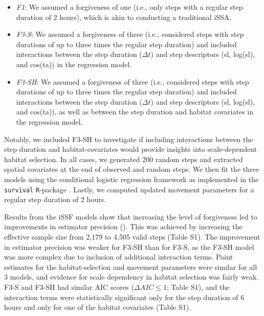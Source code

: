 \documentclass[abstract=on,10pt,a4paper,bibliography=totocnumbered]{article}
\begin{document}
\begin{itemize}
  \item \textit{F1}: We assumed a forgiveness of one (i.e., only steps with a
  regular step duration of 2 hours), which is akin to conducting a traditional
  iSSA.

  \item \textit{F3-S}: We assumed a forgiveness of three (i.e., considered steps
  with step durations of up to three times the regular step duration) and
  included interactions between the step duration ($\Delta t$) and step
  descriptors (sl, log(sl), and cos(ta)) in the regression model.

  \item \textit{F3-SH}: We assumed a forgiveness of three (i.e., considered
  steps with step durations of up to three times the regular step duration) and
  included interactions between the step duration ($\Delta t$) and step
  descriptors (sl, log(sl), and cos(ta)), as well as between the step duration
  and habitat covariates in the regression model.

\end{itemize}

\noindent Notably, we included F3-SH to investigate if including interactions
between the step duration and habitat-covariates would provide insights into
scale-dependent habitat selection. In all cases, we generated 200 random steps
and extracted spatial covariates at the end of observed and random steps. We
then fit the three models using the conditional logistic regression framework as
implemented in the \texttt{survival} \texttt{R}-package \citep{Therneau.2023}.
Lastly, we computed updated movement parameters for a regular step duration of 2
hours.

Results from the iSSF models show that increasing the level of forgiveness led
to improvements in estimator precision (). This was achieved by
increasing the effective sample size from 2,179 to 4,505 valid steps (Table S1).
The improvement in estimator precision was weaker for F3-SH than for F3-S, as
the F3-SH model was more complex due to inclusion of additional interaction
terms. Point estimates for the habitat-selection and movement parameters were
similar for all 3 models, and evidence for scale dependency in habitat selection
was fairly weak. F3-S and F3-SH had similar AIC scores ($\Delta AIC \leq 1$;
Table S1), and the interaction terms were statistically significant only for the
step duration of 6 hours and only for one of the habitat covariates (Table S1).
\end{document}
